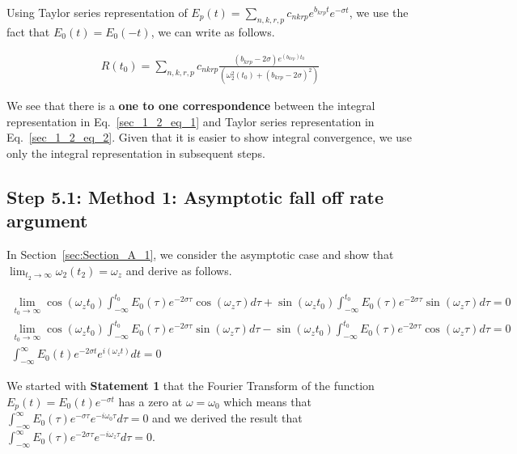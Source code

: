 \documentclass[11pt]{elsarticle}
\begin{document}
Using Taylor series representation of $E_p(t)=  \displaystyle\sum\limits_{n,k,r,p}  c_{nkrp} e^{b_{krp} t} e^{-\sigma t}$,  we use the fact that $E_0(t)=E_0(-t)$,  we can write as follows.

\begin{eqnarray*}\label{sec_1_2_eq_2}   
R(t_0) =   \displaystyle\sum\limits_{n,k,r,p}  c_{nkrp}   \frac{ (b_{krp}-2\sigma) e^{ (b_{krp}) t_0}}{(\omega_2^{2}(t_0) + (b_{krp}-2\sigma)^{2})} 
\end{eqnarray*}
\begin{equation} \end{equation}

We see that there is a \textbf{one to one correspondence} between the integral representation in Eq.~\ref{sec_1_2_eq_1} and Taylor series representation in Eq.~\ref{sec_1_2_eq_2}. Given that it is easier to show integral convergence, we use only the integral representation in subsequent steps.

\subsection{\label{sec:level2} \textbf{Step 5.1: Method 1: Asymptotic fall off rate argument  } \protect\\  \lowercase{} }

In Section~\ref{sec:Section_A_1}, we consider the asymptotic case and show that $\lim_{t_2 \to \infty}  \omega_{2}(t_2) =  \omega_z $  and derive as follows.


\begin{eqnarray*}\label{sec_1_2_eq_5}  
\lim_{t_0 \to \infty}  \cos{ (\omega_z  t_0)} \int_{-\infty}^{t_0}    E_0(\tau)  e^{ - 2 \sigma \tau}  \cos{ ( \omega_z  \tau)} d\tau + \sin{ (\omega_z  t_0)}  \int_{-\infty}^{t_0}  E_0(\tau)  e^{ - 2 \sigma \tau} \sin{ (\omega_z  \tau)} d\tau   = 0 \\
\lim_{t_0 \to \infty}  \cos{ (\omega_z  t_0)} \int_{-\infty}^{t_0}    E_0(\tau)  e^{ - 2 \sigma \tau}  \sin{ ( \omega_z  \tau)} d\tau - \sin{ (\omega_z  t_0)}  \int_{-\infty}^{t_0}  E_0(\tau)  e^{ - 2 \sigma \tau} \cos{ (\omega_z  \tau)} d\tau   = 0 \\
\int_{-\infty}^{\infty}     E_{0}( t)  e^{ -2 \sigma t}  e^{ i( \omega_z t)} dt = 0
\end{eqnarray*}
\begin{equation} \end{equation}

We started with \textbf{Statement 1} that the Fourier Transform of the function $E_p(t) = E_0(t) e^{-\sigma t} $ has a zero at $\omega = \omega_{0}$ which means that $\int_{-\infty}^{\infty}    E_0(\tau) e^{- \sigma \tau} e^{-i \omega_0 \tau} d\tau = 0$ and we derived the result that $\int_{-\infty}^{\infty}    E_0(\tau) e^{-2 \sigma \tau} e^{-i  \omega_z \tau} d\tau = 0$.\\
\end{document}
